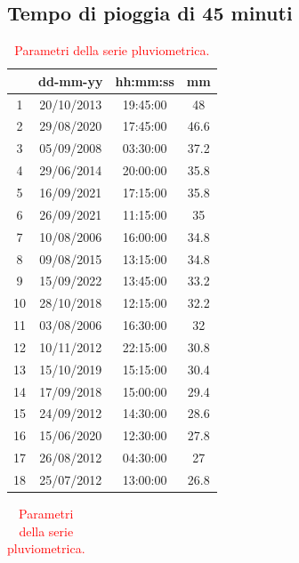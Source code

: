 \subsection{Tempo di pioggia di 45 minuti}

\begin{table}[H]
    \begin{minipage}{.5\linewidth}
      \caption{\textcolor{red}{Campione della serie pluviometrica.}}
      \centering
        \begin{tabular}{cccc}
            \toprule
            & dd-mm-yy   & hh:mm:ss & mm \\
         \midrule
         1  & 20/10/2013 & 19:45:00 & 48   \\
         2  & 29/08/2020 & 17:45:00 & 46.6 \\
         3  & 05/09/2008 & 03:30:00 & 37.2 \\
         4  & 29/06/2014 & 20:00:00 & 35.8 \\
         5  & 16/09/2021 & 17:15:00 & 35.8 \\
         6  & 26/09/2021 & 11:15:00 & 35   \\
         7  & 10/08/2006 & 16:00:00 & 34.8 \\
         8  & 09/08/2015 & 13:15:00 & 34.8 \\
         9  & 15/09/2022 & 13:45:00 & 33.2 \\
         10 & 28/10/2018 & 12:15:00 & 32.2 \\
         11 & 03/08/2006 & 16:30:00 & 32   \\
         12 & 10/11/2012 & 22:15:00 & 30.8 \\
         13 & 15/10/2019 & 15:15:00 & 30.4 \\
         14 & 17/09/2018 & 15:00:00 & 29.4 \\
         15 & 24/09/2012 & 14:30:00 & 28.6 \\
         16 & 15/06/2020 & 12:30:00 & 27.8 \\
         17 & 26/08/2012 & 04:30:00 & 27   \\
         18 & 25/07/2012 & 13:00:00 & 26.8 \\
         \bottomrule
        \end{tabular}
    \end{minipage}%
    \begin{minipage}{.5\linewidth}
      \centering
        \caption{\textcolor{red}{Parametri della serie pluviometrica.}}
        \begin{tabular}{cc}

\end{tabular}
\end{minipage}
\end{table}

